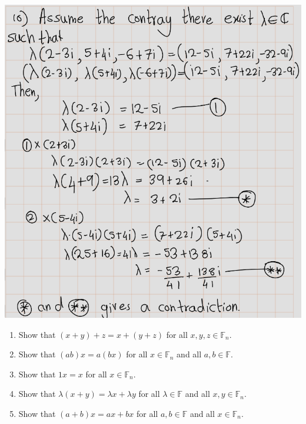 \documentclass[
]{book}
\theoremstyle{definition}
\theoremstyle{definition}
\theoremstyle{definition}
\theoremstyle{definition}
\theoremstyle{remark}
\begin{document}
\includegraphics[width=10.36in]{fig/Ex1A/Ex10}

\begin{enumerate}
\def\labelenumi{\arabic{enumi}.}
\setcounter{enumi}{10}
\item
  Show that \((x + y) + z = x + (y + z)\) for all \(x, y, z \in \mathbb{F}_n\).
\item
  Show that \((ab)x = a(bx)\) for all \(x \in \mathbb{F}_n\) and all \(a, b \in \mathbb{F}\).
\item
  Show that \(1x = x\) for all \(x \in \mathbb{F}_n\).
\item
  Show that \(\lambda(x + y) = \lambda x + \lambda y\) for all \(\lambda \in \mathbb{F}\) and all \(x, y \in \mathbb{F}_n\).
\item
  Show that \((a + b)x = ax + bx\) for all \(a, b \in \mathbb{F}\) and all \(x \in \mathbb{F}_n\).
\end{enumerate}

  
\end{document}
